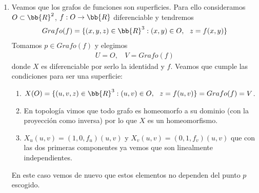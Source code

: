 \begin{ejemplo}
\begin{enumerate}
\begin{enumerate}
            \item Se tiene para todo $(u,v)\in U$:
            \begin{gather*}
                X_u(u,v) = (1,0,A)\\
                X_v(u,v) = (0,1,B)
            \end{gather*}
            y es fácil ver que son linealmente independientes (mirando las 2 primeras componentes de cada derivada parcial).
        \end{enumerate}
        \item Veamos que los grafos de funciones son superficies. Para ello consideramos $O\subset \bb{R}^2$, $f:O\to \bb{R}$ diferenciable y tendremos
        \begin{gather*}
            Grafo(f) = \{(x,y,z)\in \bb{R}^3:(x,y)\in O,\ \ z=f(x,y)\}
        \end{gather*}
        Tomamos $p\in Grafo(f)$ y elegimos
        \begin{gather*}
            U=O,\ \ \ \ V=Grafo(f)
        \end{gather*}
        donde $X$ es diferenciable por serlo la identidad y $f$. Veamos que cumple las condiciones para ser una superficie:
        \begin{enumerate}
            \item $X(O) = \{(u,v,z)\in \bb{R}^3 : (u,v)\in O,\ \ z=f(u,v)\} = Grafo(f) = V$.
            \item En topología vimos que todo grafo es homeomorfo a su dominio (con la proyección como inversa) por lo que $X$ es un homeomorfismo.
            \item $X_u(u,v) = (1,0,f_u)(u,v)$ y $X_v(u,v)=(0,1,f_v)(u,v)$ que con las dos primeras componentes ya vemos que son linealmente independientes.
        \end{enumerate}
        En este caso vemos de nuevo que estos elementos no dependen del punto $p$ escogido.



\end{enumerate}
\end{ejemplo}
